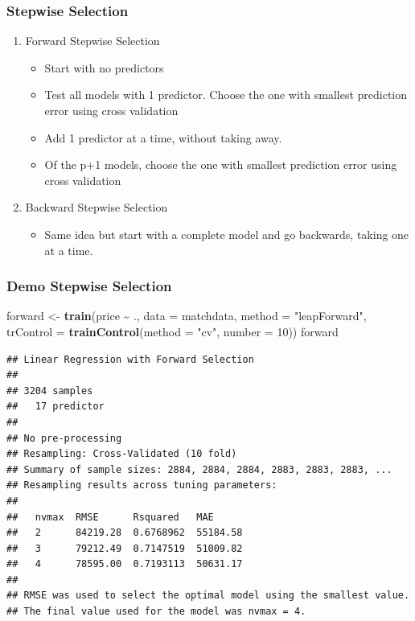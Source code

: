 \documentclass[
  shownotes,
  xcolor={svgnames},
  hyperref={colorlinks,citecolor=DarkBlue,linkcolor=DarkRed,urlcolor=DarkBlue}
  ]{beamer}
\newenvironment{Shaded}{\begin{snugshade}}{\end{snugshade}}
\newcommand{\DataTypeTok}[1]{\textcolor[rgb]{0.13,0.29,0.53}{#1}}
\newcommand{\DecValTok}[1]{\textcolor[rgb]{0.00,0.00,0.81}{#1}}
\newcommand{\KeywordTok}[1]{\textcolor[rgb]{0.13,0.29,0.53}{\textbf{#1}}}
\newcommand{\NormalTok}[1]{#1}
\newcommand{\OperatorTok}[1]{\textcolor[rgb]{0.81,0.36,0.00}{\textbf{#1}}}
\newcommand{\StringTok}[1]{\textcolor[rgb]{0.31,0.60,0.02}{#1}}
\begin{document}
\begin{frame}[fragile]
\frametitle{Stepwise Selection}
 
 \begin{enumerate}
 \item Forward Stepwise Selection
 \begin{itemize}
\item Start with no predictors
\medskip
\item Test all models with 1 predictor. Choose the one with smallest prediction error using cross validation
\medskip
\item Add 1 predictor at a time, without taking away. 
\medskip
\item Of the p+1 models, choose the one with smallest prediction error using cross validation
\end{itemize}
\item  Backward Stepwise Selection
\begin{itemize}
  \item Same idea but start with a complete model and go backwards, taking one at a time. 
  \end{itemize}
\end{enumerate}
\end{frame}
\begin{frame}[fragile]
\frametitle{Demo Stepwise Selection}

\begin{scriptsize}
\begin{Shaded}
\begin{Highlighting}[]
\NormalTok{forward \textless{}{-}}\StringTok{ }\KeywordTok{train}\NormalTok{(price }\OperatorTok{\textasciitilde{}}\StringTok{ }\NormalTok{., }\DataTypeTok{data =}\NormalTok{ matchdata,}
              \DataTypeTok{method =} \StringTok{"leapForward"}\NormalTok{,}
              \DataTypeTok{trControl =} \KeywordTok{trainControl}\NormalTok{(}\DataTypeTok{method =} \StringTok{"cv"}\NormalTok{, }\DataTypeTok{number =} \DecValTok{10}\NormalTok{))}
\NormalTok{forward}
\end{Highlighting}
\end{Shaded}
\end{scriptsize}
\begin{tiny}
\begin{verbatim}
## Linear Regression with Forward Selection 
## 
## 3204 samples
##   17 predictor
## 
## No pre-processing
## Resampling: Cross-Validated (10 fold) 
## Summary of sample sizes: 2884, 2884, 2884, 2883, 2883, 2883, ... 
## Resampling results across tuning parameters:
## 
##   nvmax  RMSE      Rsquared   MAE     
##   2      84219.28  0.6768962  55184.58
##   3      79212.49  0.7147519  51009.82
##   4      78595.00  0.7193113  50631.17
## 
## RMSE was used to select the optimal model using the smallest value.
## The final value used for the model was nvmax = 4.
\end{verbatim}
\end{tiny}


\end{frame}
\end{document}
